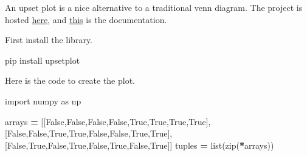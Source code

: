 \documentclass[]{book}
\newenvironment{Shaded}{\begin{snugshade}}{\end{snugshade}}
\newcommand{\ImportTok}[1]{#1}
\newcommand{\VariableTok}[1]{\textcolor[rgb]{0.00,0.00,0.00}{#1}}
\newcommand{\OperatorTok}[1]{\textcolor[rgb]{0.81,0.36,0.00}{\textbf{#1}}}
\newcommand{\BuiltInTok}[1]{#1}
\newcommand{\ExtensionTok}[1]{#1}
\newcommand{\NormalTok}[1]{#1}
\begin{document}
An upset plot is a nice alternative to a traditional venn diagram. The
project is hosted \href{https://pypi.org/project/UpSetPlot/}{here}, and
\href{https://buildmedia.readthedocs.org/media/pdf/upsetplot/latest/upsetplot.pdf}{this}
is the documentation.

First install the library.

\begin{Shaded}
\begin{Highlighting}[]
\ExtensionTok{pip}\NormalTok{ install upsetplot}
\end{Highlighting}
\end{Shaded}

Here is the code to create the plot.

\begin{Shaded}
\begin{Highlighting}[]
\ImportTok{import}\NormalTok{ numpy }\ImportTok{as}\NormalTok{ np}

\NormalTok{arrays }\OperatorTok{=}\NormalTok{ [[}\VariableTok{False}\NormalTok{,}\VariableTok{False}\NormalTok{,}\VariableTok{False}\NormalTok{,}\VariableTok{False}\NormalTok{,}\VariableTok{True}\NormalTok{,}\VariableTok{True}\NormalTok{,}\VariableTok{True}\NormalTok{,}\VariableTok{True}\NormalTok{],}
\NormalTok{          [}\VariableTok{False}\NormalTok{,}\VariableTok{False}\NormalTok{,}\VariableTok{True}\NormalTok{,}\VariableTok{True}\NormalTok{,}\VariableTok{False}\NormalTok{,}\VariableTok{False}\NormalTok{,}\VariableTok{True}\NormalTok{,}\VariableTok{True}\NormalTok{],}
\NormalTok{          [}\VariableTok{False}\NormalTok{,}\VariableTok{True}\NormalTok{,}\VariableTok{False}\NormalTok{,}\VariableTok{True}\NormalTok{,}\VariableTok{False}\NormalTok{,}\VariableTok{True}\NormalTok{,}\VariableTok{False}\NormalTok{,}\VariableTok{True}\NormalTok{]]}
\NormalTok{tuples }\OperatorTok{=} \BuiltInTok{list}\NormalTok{(}\BuiltInTok{zip}\NormalTok{(}\OperatorTok{*}\NormalTok{arrays))}


\end{Highlighting}
\end{Shaded}
\end{document}
